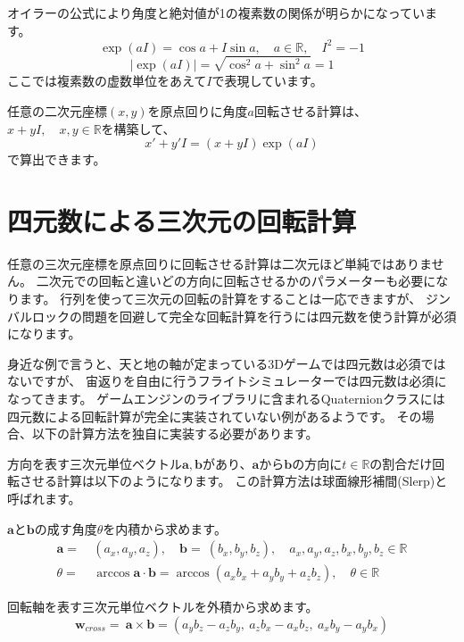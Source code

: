 \documentclass[a4paper,12pt]{jsreport}
\begin{document}
オイラーの公式により角度と絶対値が1の複素数の関係が明らかになっています。
\begin{equation}
\exp(aI)=\cos a+I\sin a,\quad a\in\mathbb{R},\quad I^2=-1
\end{equation}
\begin{equation}
|\exp(aI)|=\sqrt{\cos^2 a+\sin^2 a}=1
\end{equation}
ここでは複素数の虚数単位をあえて$I$で表現しています。

任意の二次元座標$(x,y)$を原点回りに角度$a$回転させる計算は、$x+yI,\quad x,y\in\mathbb{R}$を構築して、
\begin{equation}
x'+y'I=(x+yI)\exp(aI)
\end{equation}
で算出できます。

\section{四元数による三次元の回転計算}

任意の三次元座標を原点回りに回転させる計算は二次元ほど単純ではありません。
二次元での回転と違いどの方向に回転させるかのパラメーターも必要になります。
行列を使って三次元の回転の計算をすることは一応できますが、
ジンバルロックの問題を回避して完全な回転計算を行うには四元数を使う計算が必須になります。

身近な例で言うと、天と地の軸が定まっている3Dゲームでは四元数は必須ではないですが、
宙返りを自由に行うフライトシミュレーターでは四元数は必須になってきます。
ゲームエンジンのライブラリに含まれるQuaternionクラスには四元数による回転計算が完全に実装されていない例があるようです。
その場合、以下の計算方法を独自に実装する必要があります。

方向を表す三次元単位ベクトル$\bm{a},\bm{b}$があり、$\bm{a}$から$\bm{b}$の方向に$t\in\mathbb{R}$の割合だけ回転させる計算は以下のようになります。
この計算方法は球面線形補間(Slerp)と呼ばれます。

$\bm{a}$と$\bm{b}$の成す角度$\theta$を内積から求めます。
\begin{equation}
\begin{split}
\bm{a}=~&(a_x,a_y,a_z),\quad \bm{b}=~(b_x,b_y,b_z),\quad a_x,a_y,a_z,b_x,b_y,b_z\in\mathbb{R}\\
\theta=~&\arccos\bm{a}\cdot\bm{b}=\arccos(a_xb_x+a_yb_y+a_zb_z),\quad \theta\in\mathbb{R}
\end{split}
\end{equation}

回転軸を表す三次元単位ベクトルを外積から求めます。
\begin{equation}
\bm{w}_{cross}=~\bm{a}\times\bm{b}=(a_yb_z-a_zb_y,~a_zb_x-a_xb_z,~a_xb_y-a_yb_x)
\end{equation}
\end{document}
